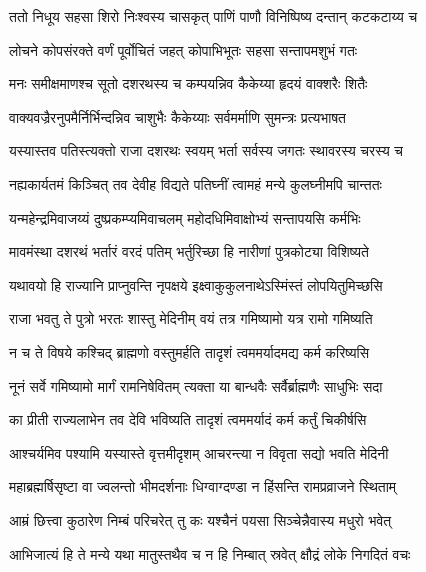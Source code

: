 
\twolineshloka
{ततो निधूय सहसा शिरो निःश्वस्य चासकृत्}
{पाणिं पाणौ विनिष्पिष्य दन्तान् कटकटाय्य च} %

\twolineshloka
{लोचने कोपसंरक्ते वर्णं पूर्वोचितं जहत्}
{कोपाभिभूतः सहसा सन्तापमशुभं गतः} %

\twolineshloka
{मनः समीक्षमाणश्च सूतो दशरथस्य च}
{कम्पयन्निव कैकेय्या हृदयं वाक्शरैः शितैः} %

\twolineshloka
{वाक्यवज्रैरनुपमैर्निर्भिन्दन्निव चाशुभैः}
{कैकेय्याः सर्वमर्माणि सुमन्त्रः प्रत्यभाषत} %

\twolineshloka
{यस्यास्तव पतिस्त्यक्तो राजा दशरथः स्वयम्}
{भर्ता सर्वस्य जगतः स्थावरस्य चरस्य च} %

\twolineshloka
{नह्यकार्यतमं किञ्चित् तव देवीह विद्यते}
{पतिघ्नीं त्वामहं मन्ये कुलघ्नीमपि चान्ततः} %

\twolineshloka
{यन्महेन्द्रमिवाजय्यं दुष्प्रकम्प्यमिवाचलम्}
{महोदधिमिवाक्षोभ्यं सन्तापयसि कर्मभिः} %

\twolineshloka
{मावमंस्था दशरथं भर्तारं वरदं पतिम्}
{भर्तुरिच्छा हि नारीणां पुत्रकोट्या विशिष्यते} %

\twolineshloka
{यथावयो हि राज्यानि प्राप्नुवन्ति नृपक्षये}
{इक्ष्वाकुकुलनाथेऽस्मिंस्तं लोपयितुमिच्छसि} %

\twolineshloka
{राजा भवतु ते पुत्रो भरतः शास्तु मेदिनीम्}
{वयं तत्र गमिष्यामो यत्र रामो गमिष्यति} %

\twolineshloka
{न च ते विषये कश्चिद् ब्राह्मणो वस्तुमर्हति}
{तादृशं त्वममर्यादमद्य कर्म करिष्यसि} %

\twolineshloka
{नूनं सर्वे गमिष्यामो मार्गं रामनिषेवितम्}
{त्यक्ता या बान्धवैः सर्वैर्ब्राह्मणैः साधुभिः सदा} %

\twolineshloka
{का प्रीती राज्यलाभेन तव देवि भविष्यति}
{तादृशं त्वममर्यादं कर्म कर्तुं चिकीर्षसि} %

\twolineshloka
{आश्चर्यमिव पश्यामि यस्यास्ते वृत्तमीदृशम्}
{आचरन्त्या न विवृता सद्यो भवति मेदिनी} %

\twolineshloka
{महाब्रह्मर्षिसृष्टा वा ज्वलन्तो भीमदर्शनाः}
{धिग्वाग्दण्डा न हिंसन्ति रामप्रव्राजने स्थिताम्} %

\twolineshloka
{आम्रं छित्त्वा कुठारेण निम्बं परिचरेत् तु कः}
{यश्चैनं पयसा सिञ्चेन्नैवास्य मधुरो भवेत्} %

\twolineshloka
{आभिजात्यं हि ते मन्ये यथा मातुस्तथैव च}
{न हि निम्बात् स्रवेत् क्षौद्रं लोके निगदितं वचः} %

